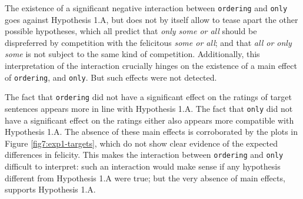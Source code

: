 The existence of a significant negative interaction between \texttt{ordering} and \texttt{only} goes against Hypothesis 1.A, but does not by itself allow to tease apart the other possible hypotheses, which all predict that \textit{only some or all} should be dispreferred by competition with the felicitous \textit{some or all}; and that \textit{all or only some} is not subject to the same kind of competition. Additionally, this interpretation of the interaction crucially hinges on the existence of a main effect of \texttt{ordering}, and \texttt{only}. But such effects were not detected.

The fact that \texttt{ordering} did not have a significant effect on the ratings of target sentences appears more in line with Hypothesis 1.A. The fact that \texttt{only} did not have a significant effect on the ratings either also appears more compatible with Hypothesis 1.A. The absence of these main effects is corroborated by the plots in Figure \ref{fig7:exp1-targets}, which do not show clear evidence of the expected differences in felicity. This makes the interaction between \texttt{ordering} and \texttt{only} difficult to interpret: such an interaction would make sense if any hypothesis different from Hypothesis 1.A were true; but the very absence of main effects, supports Hypothesis 1.A.


